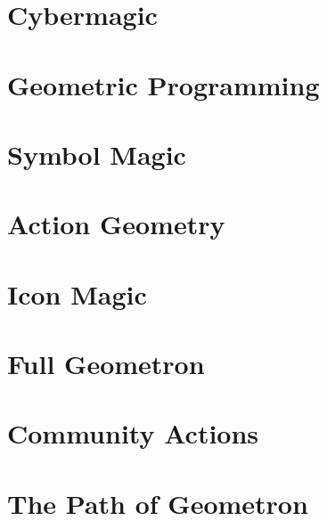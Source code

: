 \documentclass[ebook,12pt,openany]{memoir} %
\begin{document}
\chapter{Cybermagic}

\chapter{Geometric Programming}

\chapter{Symbol Magic}

\chapter{Action Geometry}

\chapter{Icon Magic}

\chapter{Full Geometron}

\chapter{Community Actions}

\chapter{The Path of Geometron}



\end{document}
